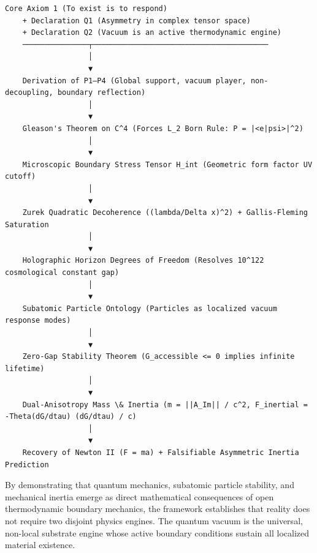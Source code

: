 \documentclass[11pt,a4paper]{article}
\theoremstyle{definition}\newtheorem{definition}{Definition}
\theoremstyle{remark}\newtheorem{remark}{Remark}
\begin{document}
\begin{verbatim}Core Axiom 1 (To exist is to respond)
    + Declaration Q1 (Asymmetry in complex tensor space)
    + Declaration Q2 (Vacuum is an active thermodynamic engine)
    ───────────────┬────────────────────────────────────────
                   │
                   ▼
    Derivation of P1–P4 (Global support, vacuum player, non-decoupling, boundary reflection)
                   │
                   ▼
    Gleason's Theorem on C^4 (Forces L_2 Born Rule: P = |<e|psi>|^2)
                   │
                   ▼
    Microscopic Boundary Stress Tensor H_int (Geometric form factor UV cutoff)
                   │
                   ▼
    Zurek Quadratic Decoherence ((lambda/Delta x)^2) + Gallis-Fleming Saturation
                   │
                   ▼
    Holographic Horizon Degrees of Freedom (Resolves 10^122 cosmological constant gap)
                   │
                   ▼
    Subatomic Particle Ontology (Particles as localized vacuum response modes)
                   │
                   ▼
    Zero-Gap Stability Theorem (G_accessible <= 0 implies infinite lifetime)
                   │
                   ▼
    Dual-Anisotropy Mass \& Inertia (m = ||A_Im|| / c^2, F_inertial = -Theta(dG/dtau) (dG/dtau) / c)
                   │
                   ▼
    Recovery of Newton II (F = ma) + Falsifiable Asymmetric Inertia Prediction
\end{verbatim}

By demonstrating that quantum mechanics, subatomic particle stability, and mechanical inertia emerge as direct mathematical consequences of open thermodynamic boundary mechanics, the framework establishes that reality does not require two disjoint physics engines. The quantum vacuum is the universal, non-local substrate engine whose active boundary conditions sustain all localized material existence.
\end{document}
